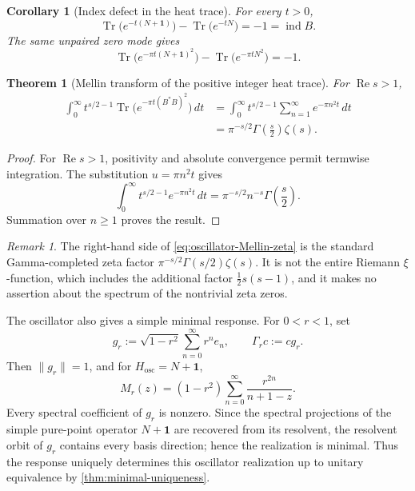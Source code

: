\documentclass[11pt,reqno]{scrartcl}
\newcommand{\idop}{\mathbf 1}
\DeclareMathOperator{\ind}{ind}
\DeclareMathOperator{\Tr}{Tr}
\theoremstyle{plain}
\newtheorem{theorem}{Theorem}[section]
\newtheorem{corollary}[corollary]{Corollary}
\theoremstyle{definition}
\theoremstyle{remark}
\newtheorem{remark}[remark]{Remark}
\begin{document}
\begin{corollary}[Index defect in the heat trace]
\label{cor:oscillator-heat-index}
For every \(t>0\),
\begin{equation}
  \Tr\bigl(e^{-t(N+\idop)}\bigr)
  -\Tr\bigl(e^{-tN}\bigr)
  =-1
  =\ind B.
  \label{eq:oscillator-linear-heat-index}
\end{equation}
The same unpaired zero mode gives
\begin{equation}
  \Tr\bigl(e^{-\pi t(N+\idop)^2}\bigr)
  -\Tr\bigl(e^{-\pi tN^2}\bigr)
  =-1.
  \label{eq:oscillator-square-heat-index}
\end{equation}
\end{corollary}

\begin{theorem}[Mellin transform of the positive integer heat trace]
\label{thm:oscillator-zeta}
For \(\operatorname{Re}s>1\),
\begin{align}
  \int_0^\infty
  t^{s/2-1}
  \Tr\bigl(e^{-\pi t(B^*B)^2}\bigr)\,dt
  &=\int_0^\infty
  t^{s/2-1}\sum_{n=1}^\infty e^{-\pi n^2t}\,dt
  \label{eq:oscillator-Mellin-start}\\
  &=\pi^{-s/2}\Gamma\!\left(\frac s2\right)\zeta(s).
  \label{eq:oscillator-Mellin-zeta}
\end{align}
\end{theorem}

\begin{proof}
For \(\operatorname{Re}s>1\), positivity and absolute convergence permit
termwise integration.  The substitution \(u=\pi n^2t\) gives
\begin{equation}
  \int_0^\infty t^{s/2-1}e^{-\pi n^2t}\,dt
  =\pi^{-s/2}n^{-s}\Gamma\!\left(\frac s2\right).
\end{equation}
Summation over \(n\ge1\) proves the result.
\end{proof}

\begin{remark}
The right-hand side of \eqref{eq:oscillator-Mellin-zeta} is the standard
Gamma-completed zeta factor
\(\pi^{-s/2}\Gamma(s/2)\zeta(s)\).  It is not the entire Riemann
\(\xi\)-function, which includes the additional factor
\(\tfrac12s(s-1)\), and it makes no assertion about the spectrum of the
nontrivial zeta zeros.
\end{remark}

The oscillator also gives a simple minimal response.  For \(0<r<1\), set
\begin{equation}
  g_r:=\sqrt{1-r^2}\sum_{n=0}^\infty r^n e_n,
  \qquad
  \Gamma_rc:=cg_r.
  \label{eq:oscillator-cyclic-vector}
\end{equation}
Then \(\|g_r\|=1\), and for \(H_{\mathrm{osc}}=N+\idop\),
\begin{equation}
  M_r(z)
  =(1-r^2)\sum_{n=0}^\infty
  \frac{r^{2n}}{n+1-z}.
  \label{eq:oscillator-response}
\end{equation}
Every spectral coefficient of \(g_r\) is nonzero.  Since the spectral
projections of the simple pure-point operator \(N+\idop\) are recovered from
its resolvent, the resolvent orbit of \(g_r\) contains every basis direction;
hence the realization is minimal.  Thus the response uniquely determines
this oscillator realization
up to unitary equivalence by \cref{thm:minimal-uniqueness}.
\end{document}
